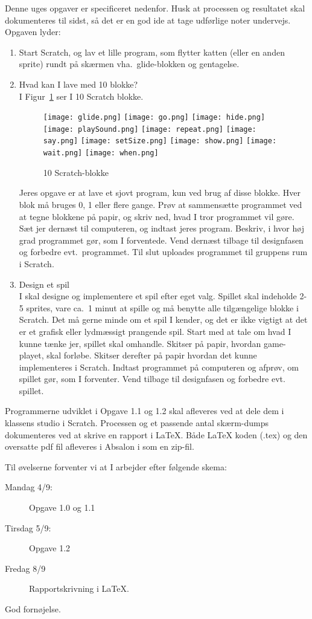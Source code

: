 \documentclass[a4paper,12pt]{article}
\begin{document}
Denne uges opgaver er specificeret nedenfor. Husk at processen og resultatet skal dokumenteres til sidst, så det er en god ide at tage udførlige noter undervejs. Opgaven lyder:
\begin{enumerate}[label=1g.\arabic*,start=0]
\item Start Scratch, og lav et lille program, som flytter katten (eller en anden sprite) rundt på skærmen vha.\ glide-blokken og gentagelse.
\item Hvad kan I lave med 10 blokke?\\
  I Figur~\ref{fig:blokke} ser I 10 Scratch blokke.
  \begin{figure}
    \centering
    \texttt{[image: glide.png]}
    \texttt{[image: go.png]}
    \texttt{[image: hide.png]}
    \texttt{[image: playSound.png]}
    \texttt{[image: repeat.png]}
    \texttt{[image: say.png]}
    \texttt{[image: setSize.png]}
    \texttt{[image: show.png]}
    \texttt{[image: wait.png]}
    \texttt{[image: when.png]}
    \caption{10 Scratch-blokke}
    \label{fig:blokke}
  \end{figure}
  Jeres opgave er at lave et sjovt program, kun ved brug af disse blokke. Hver blok må bruges 0, 1 eller flere gange. Prøv at sammensætte programmet ved at tegne blokkene på papir, og skriv ned, hvad I tror programmet vil gøre. Sæt jer dernæst til computeren, og indtast jeres program. Beskriv, i hvor høj grad programmet gør, som I forventede. Vend dernæst tilbage til designfasen og forbedre evt.\ programmet. Til slut uploades programmet til gruppens rum i Scratch.
\item Design et spil\\
  I skal designe og implementere et spil efter eget valg. Spillet skal indeholde 2-5 sprites, vare ca.\ 1 minut at spille og må benytte alle tilgængelige blokke i Scratch. Det må gerne minde om et spil I kender, og det er ikke vigtigt at det er et grafisk eller lydmæssigt prangende spil. Start med at tale om hvad I kunne tænke jer, spillet skal omhandle. Skitser på papir, hvordan game-playet, skal forløbe. Skitser derefter på papir hvordan det kunne implementeres i Scratch. Indtast programmet på computeren og afprøv, om spillet gør, som I forventer. Vend tilbage til designfasen og forbedre evt. spillet.
\end{enumerate}
Programmerne udviklet i Opgave 1.1 og 1.2 skal afleveres ved at dele dem i klassens studio i Scratch. Processen og et passende antal skærm-dumps dokumenteres ved at skrive en rapport i LaTeX. Både LaTeX koden (.tex) og den oversatte pdf fil afleveres i Absalon i som en zip-fil.

Til øvelserne forventer vi at I arbejder efter følgende skema:
\begin{description}
\item[Mandag 4/9:] Opgave 1.0 og 1.1
\item[Tirsdag 5/9:] Opgave 1.2
\item[Fredag 8/9]  Rapportskrivning i LaTeX.
\end{description}

\flushright God fornøjelse.
\end{document}
